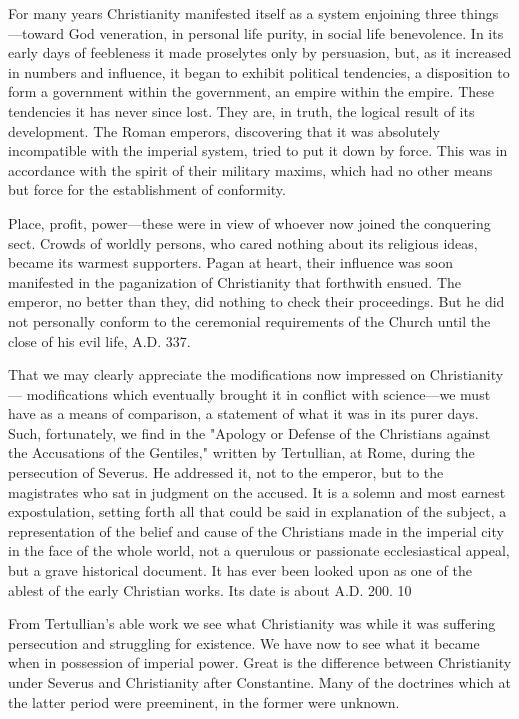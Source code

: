 For many years Christianity manifested itself as a system enjoining three things—toward
God veneration, in personal life purity, in social life benevolence. In its early days of
feebleness it made proselytes only by persuasion, but, as it increased in numbers and
influence, it began to exhibit political tendencies, a disposition to form a government within
the government, an empire within the empire. These tendencies it has never since lost. They
are, in truth, the logical result of its development. The Roman emperors, discovering that it
was absolutely incompatible with the imperial system, tried to put it down by force. This was
in accordance with the spirit of their military maxims, which had no other means but force
for the establishment of conformity.

Place, profit, power—these were in view of whoever now joined the conquering sect. Crowds
of worldly persons, who cared nothing about its religious ideas, became its warmest
supporters. Pagan at heart, their influence was soon manifested in the paganization of
Christianity that forthwith ensued. The emperor, no better than they, did nothing to check
their proceedings. But he did not personally conform to the ceremonial requirements of the
Church until the close of his evil life, A.D. 337.

That we may clearly appreciate the modifications now impressed on Christianity—
modifications which eventually brought it in conflict with science—we must have as a means
of comparison, a statement of what it was in its purer days. Such, fortunately, we find in the
"Apology or Defense of the Christians against the Accusations of the Gentiles," written by
Tertullian, at Rome, during the persecution of Severus. He addressed it, not to the emperor,
but to the magistrates who sat in judgment on the accused. It is a solemn and most earnest
expostulation, setting forth all that could be said in explanation of the subject, a
representation of the belief and cause of the Christians made in the imperial city in the face
of the whole world, not a querulous or passionate ecclesiastical appeal, but a grave historical
document. It has ever been looked upon as one of the ablest of the early Christian works. Its
date is about A.D. 200. 10

From Tertullian's able work we see what Christianity was while it was suffering persecution
and struggling for existence. We have now to see what it became when in possession of
imperial power. Great is the difference between Christianity under Severus and Christianity
after Constantine. Many of the doctrines which at the latter period were preeminent, in the
former were unknown.

